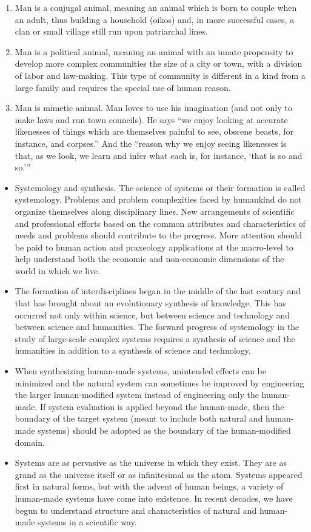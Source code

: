 \begin{enumerate}
	\item Man is a conjugal animal, meaning an animal which is born to couple when an adult, thus building a household (oikos) and, in more successful cases, a clan or small village still run upon patriarchal lines.
	\item Man is a political animal, meaning an animal with an innate propensity to develop more complex communities the size of a city or town, with a division of labor and law-making. This type of community is different in a kind from a large family and requires the special use of human reason.
	\item Man is mimetic animal. Man loves to use his imagination (and not only to make laws and run town councils). He says ``we enjoy looking at accurate likenesses of things which are themselves painful to see, obscene beasts, for instance, and corpses.''  And the ``reason why we enjoy seeing likenesses is that, as we look, we learn and infer what each is, for instance, ‘that is so and so.’''
\end{enumerate}

\begin{itemize}
	\item Systemology and synthesis. The science of systems or their formation is called systemology. Problems and problem complexities faced by humankind do not organize themselves along disciplinary lines. New arrangements of scientific and professional efforts based on the common attributes and characteristics of needs and problems should contribute to the progress. More attention should be paid to human action and praxeology applications at the macro-level to help understand both the economic and non-economic dimensions of the world in which we live.
	\item The formation of interdisciplines began in the middle of the last century and that has brought about an evolutionary synthesis of knowledge. This has occurred not only within science, but between science and technology and between science and humanities. The forward progress of systemology in the study of large-scale complex systems requires a synthesis of science and the humanities in addition to a synthesis of science and technology.
	\item When synthesizing human-made systems, unintended effects can be minimized and the natural system can sometimes be improved by engineering the larger human-modified system instead of engineering only the human-made. If system evaluation is applied beyond the human-made, then the boundary of the target system (meant to include both natural and human-made systems) should be adopted as the boundary of the human-modified domain.
	\item Systems are as pervasive as the universe in which they exist. They are as grand as the universe itself or as infinitesimal as the atom. Systems appeared first in natural forms, but with the advent of human beings, a variety of human-made systems have come into existence. In recent decades, we have begun to understand structure and characteristics of natural and human-made systems in a scientific way.
\end{itemize}

